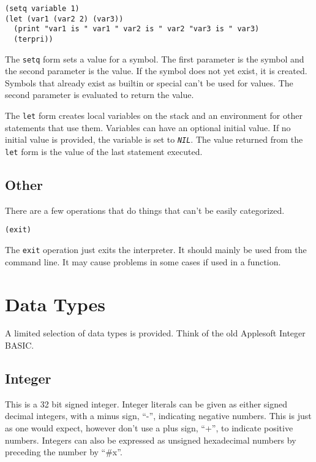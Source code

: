 \documentclass[10pt, openany]{book}
\newcommand{\function}[1]{\texttt{#1}}
\newcommand{\constant}[1]{\emph{\texttt{#1}}}
\begin{document}
\begin{lstlisting}
(setq variable 1)
(let (var1 (var2 2) (var3))
  (print "var1 is " var1 " var2 is " var2 "var3 is " var3)
  (terpri))
\end{lstlisting}

The \function{setq} form sets a value for a symbol.  The first parameter is the symbol and the second parameter is the value.  If the symbol does not yet exist, it is created.  Symbols that already exist as builtin or special can't be used for values.  The second parameter is evaluated to return the value.

The \function{let} form creates local variables on the stack and an environment for other statements that use them.  Variables can have an optional initial value.  If no initial value is provided, the variable is set to \constant{NIL}.  The value returned from the \function{let} form is the value of the last statement executed.

\subsection{Other}
There are a few operations that do things that can't be easily categorized.

\begin{lstlisting}
(exit)
\end{lstlisting}

The \function{exit} operation just exits the interpreter.  It should mainly be used from the command line.  It may cause problems in some cases if used in a function.

\section{Data Types}
A limited selection of data types is provided.  Think of the old Applesoft Integer BASIC.

\subsection{Integer}
This is a 32 bit signed integer.  Integer literals can be given as either signed decimal integers, with a minus sign, ``-'', indicating negative numbers.  This is just as one would expect, however don't use a plus sign, ``+'', to indicate positive numbers.  Integers can also be expressed as unsigned hexadecimal numbers by preceding the number by ``\#x''.
\end{document}
